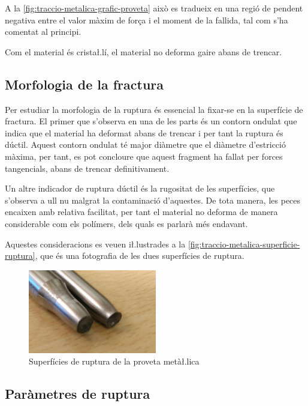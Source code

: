 \documentclass[a4paper]{report}
\begin{document}
A la \autoref{fig:traccio-metalica-grafic-proveta} això es tradueix en una regió de pendent negativa entre el valor màxim de força i el moment de la fallida, tal com s'ha comentat al principi.

Com el material és crista\l.lí, el material no deforma gaire abans de trencar.

\subsection{Morfologia de la fractura}
Per estudiar la morfologia de la ruptura és essencial la fixar-se en la superfície de fractura. El primer que s'observa en una de les parts és un contorn ondulat que indica que el material ha deformat abans de trencar i per tant la ruptura és dúctil. Aquest contorn ondulat té major diàmetre que el diàmetre d'estricció màxima, per tant, es pot concloure que aquest fragment ha fallat per forces tangencials, abans de trencar definitivament.

Un altre indicador de ruptura dúctil és la rugositat de les superfícies, que s'observa a ull nu malgrat la contaminació d'aquestes. De tota manera, les peces encaixen amb relativa facilitat, per tant el material no deforma de manera considerable com els polímers, dels quals es parlarà més endavant.

Aquestes consideracions es veuen i\l.lustrades a la \autoref{fig:traccio-metalica-superficie-ruptura}, que és una fotografia de les dues superfícies de ruptura. 

\begin{figure}[ht]
    \centering
    \includegraphics[width=0.5\textwidth]{images/traccio/metalica-superficie-ruptura}
    \caption{Superfícies de ruptura de la proveta metà\l.lica}
    \label{fig:traccio-metalica-superficie-ruptura}
\end{figure}

\subsection{Paràmetres de ruptura}
\end{document}
